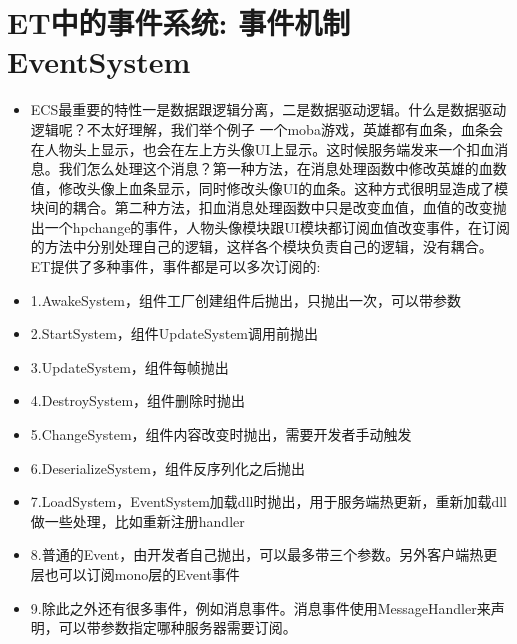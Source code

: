 \documentclass[9pt, b5paper]{article}
\begin{document}
\section{ET中的事件系统: 事件机制EventSystem}
\label{sec-24}
\begin{itemize}
\item ECS最重要的特性一是数据跟逻辑分离，二是数据驱动逻辑。什么是数据驱动逻辑呢？不太好理解，我们举个例子 一个moba游戏，英雄都有血条，血条会在人物头上显示，也会在左上方头像UI上显示。这时候服务端发来一个扣血消息。我们怎么处理这个消息？第一种方法，在消息处理函数中修改英雄的血数值，修改头像上血条显示，同时修改头像UI的血条。这种方式很明显造成了模块间的耦合。第二种方法，扣血消息处理函数中只是改变血值，血值的改变抛出一个hpchange的事件，人物头像模块跟UI模块都订阅血值改变事件，在订阅的方法中分别处理自己的逻辑，这样各个模块负责自己的逻辑，没有耦合。 ET提供了多种事件，事件都是可以多次订阅的:
\item 1.AwakeSystem，组件工厂创建组件后抛出，只抛出一次，可以带参数
\item 2.StartSystem，组件UpdateSystem调用前抛出
\item 3.UpdateSystem，组件每帧抛出
\item 4.DestroySystem，组件删除时抛出
\item 5.ChangeSystem，组件内容改变时抛出，需要开发者手动触发
\item 6.DeserializeSystem，组件反序列化之后抛出
\item 7.LoadSystem，EventSystem加载dll时抛出，用于服务端热更新，重新加载dll做一些处理，比如重新注册handler
\item 8.普通的Event，由开发者自己抛出，可以最多带三个参数。另外客户端热更层也可以订阅mono层的Event事件
\item 9.除此之外还有很多事件，例如消息事件。消息事件使用MessageHandler来声明，可以带参数指定哪种服务器需要订阅。
\end{itemize}
\end{document}
